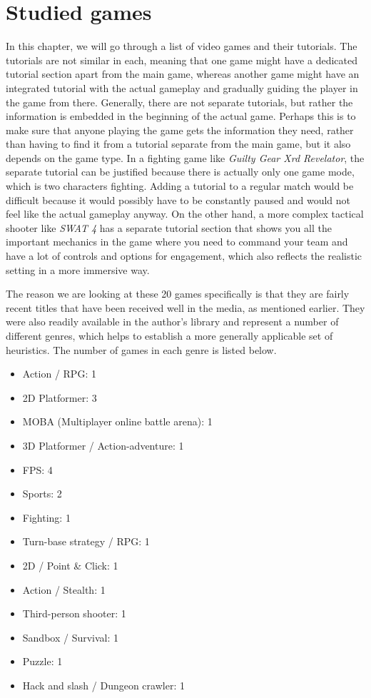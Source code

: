 \chapter{Studied games}

In this chapter, we will go through a list of video games and their tutorials. The tutorials are not similar in each, meaning that one game might have a dedicated tutorial section apart from the main game, whereas another game might have an integrated tutorial with the actual gameplay and gradually guiding the player in the game from there. Generally, there are not separate tutorials, but rather the information is embedded in the beginning of the actual game. Perhaps this is to make sure that anyone playing the game gets the information they need, rather than having to find it from a tutorial separate from the main game, but it also depends on the game type. In a fighting game like \textit{Guilty Gear Xrd Revelator}, the separate tutorial can be justified because there is actually only one game mode, which is two characters fighting. Adding a tutorial to a regular match would be difficult because it would possibly have to be constantly paused and would not feel like the actual gameplay anyway. On the other hand, a more complex tactical  shooter like \textit{SWAT 4} has a separate tutorial section that shows you all the important mechanics in the game where you need to command your team and have a lot of controls and options for engagement, which also reflects the realistic setting in a more immersive way.

The reason we are looking at these 20 games specifically is that they are fairly recent titles that have been received well in the media, as mentioned earlier. They were also readily available in the author's library and represent a number of different genres, which helps to establish a more generally applicable set of heuristics. The number of games in each genre is listed below. 

\begin{itemize}
	\item Action / RPG: 1  
	\item 2D Platformer: 3
	\item MOBA (Multiplayer online battle arena): 1
	\item 3D Platformer / Action-adventure: 1
	\item FPS: 4
	\item Sports: 2
	\item Fighting: 1
	\item Turn-base strategy / RPG: 1
	\item 2D / Point \& Click: 1
	\item Action / Stealth: 1
	\item Third-person shooter: 1
	\item Sandbox / Survival: 1
	\item Puzzle: 1
	\item Hack and slash / Dungeon crawler: 1
\end{itemize}

